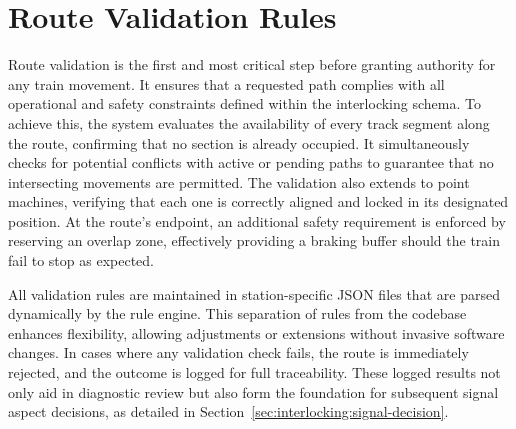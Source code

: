 \section{Route Validation Rules}
\label{sec:interlocking:route-validation}

Route validation is the first and most critical step before granting authority for any train movement. It ensures that a requested path complies with all operational and safety constraints defined within the interlocking schema. To achieve this, the system evaluates the availability of every track segment along the route, confirming that no section is already occupied. It simultaneously checks for potential conflicts with active or pending paths to guarantee that no intersecting movements are permitted. The validation also extends to point machines, verifying that each one is correctly aligned and locked in its designated position. At the route’s endpoint, an additional safety requirement is enforced by reserving an overlap zone, effectively providing a braking buffer should the train fail to stop as expected.

All validation rules are maintained in station-specific JSON files that are parsed dynamically by the rule engine. This separation of rules from the codebase enhances flexibility, allowing adjustments or extensions without invasive software changes. In cases where any validation check fails, the route is immediately rejected, and the outcome is logged for full traceability. These logged results not only aid in diagnostic review but also form the foundation for subsequent signal aspect decisions, as detailed in Section~\ref{sec:interlocking:signal-decision}.
